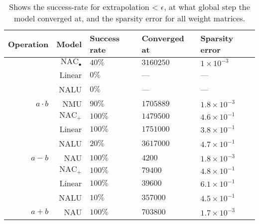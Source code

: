 \begin{table}[H]

\caption{\label{tab:function-task-static-defaults}Shows the success-rate for extrapolation < $\epsilon$, at what global step the model converged at, and the sparsity error for all weight matrices.}
\centering
\begin{tabular}{rrlll}
\toprule
Operation & Model & Success rate & Converged at & Sparsity error\\
\midrule
 & $\mathrm{NAC}_{\bullet}$ & $40\%$ & $3160250$ & $1 \times 10^{-3}$\\

 & Linear & $0\%$ & --- & ---\\

 & NALU & $0\%$ & --- & ---\\

\multirow{-4}{*}{\raggedleft\arraybackslash ${a \cdot b}$} & NMU & $90\%$ & $1705889$ & $1.8 \times 10^{-3}$\\
\cmidrule{1-5}
 & $\mathrm{NAC}_{+}$ & $100\%$ & $1479500$ & $4.6 \times 10^{-1}$\\

 & Linear & $100\%$ & $1751000$ & $3.8 \times 10^{-1}$\\

 & NALU & $20\%$ & $3617000$ & $4.7 \times 10^{-1}$\\

\multirow{-4}{*}{\raggedleft\arraybackslash $a - b$} & NAU & $100\%$ & $4200$ & $1.8 \times 10^{-3}$\\
\cmidrule{1-5}
 & $\mathrm{NAC}_{+}$ & $100\%$ & $79400$ & $4.8 \times 10^{-1}$\\

 & Linear & $100\%$ & $39600$ & $6.1 \times 10^{-1}$\\

 & NALU & $10\%$ & $357000$ & $4.5 \times 10^{-1}$\\

\multirow{-4}{*}{\raggedleft\arraybackslash $a + b$} & NAU & $100\%$ & $703800$ & $1.7 \times 10^{-3}$\\
\bottomrule
\end{tabular}
\end{table}
